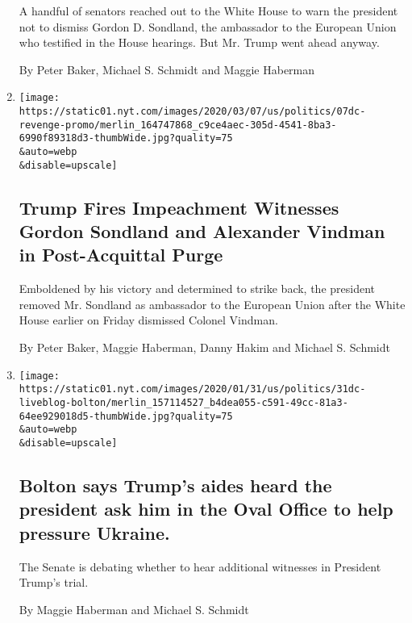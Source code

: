\begin{enumerate}
  A handful of senators reached out to the White House to warn the
  president not to dismiss Gordon D. Sondland, the ambassador to the
  European Union who testified in the House hearings. But Mr. Trump went
  ahead anyway.

  By Peter Baker, Michael S. Schmidt and Maggie Haberman
\item
  \href{/2020/02/07/us/politics/alexander-vindman-gordon-sondland-fired.html}{}

  \texttt{[image: https://static01.nyt.com/images/2020/03/07/us/politics/07dc-revenge-promo/merlin\_164747868\_c9ce4aec-305d-4541-8ba3-6990f89318d3-thumbWide.jpg?quality=75\\\&auto=webp\\\&disable=upscale]}

  \hypertarget{trump-fires-impeachment-witnesses-gordon-sondland-and-alexander-vindman-in-post-acquittal-purge}{%
  \subsection{Trump Fires Impeachment Witnesses Gordon Sondland and
  Alexander Vindman in Post-Acquittal
  Purge}\label{trump-fires-impeachment-witnesses-gordon-sondland-and-alexander-vindman-in-post-acquittal-purge}}

  Emboldened by his victory and determined to strike back, the president
  removed Mr. Sondland as ambassador to the European Union after the
  White House earlier on Friday dismissed Colonel Vindman.

  By Peter Baker, Maggie Haberman, Danny Hakim and Michael S. Schmidt
\item
  \href{/live/2020/trump-impeachment-trial-01-31/bolton-oval-office-ukraine}{}

  \texttt{[image: https://static01.nyt.com/images/2020/01/31/us/politics/31dc-liveblog-bolton/merlin\_157114527\_b4dea055-c591-49cc-81a3-64ee929018d5-thumbWide.jpg?quality=75\\\&auto=webp\\\&disable=upscale]}

  \hypertarget{bolton-says-trumps-aides-heard-the-president-ask-him-in-the-oval-office-to-help-pressure-ukraine}{%
  \subsection{Bolton says Trump's aides heard the president ask him in
  the Oval Office to help pressure
  Ukraine.}\label{bolton-says-trumps-aides-heard-the-president-ask-him-in-the-oval-office-to-help-pressure-ukraine}}

  The Senate is debating whether to hear additional witnesses in
  President Trump's trial.

  By Maggie Haberman and Michael S. Schmidt
\end{enumerate}

